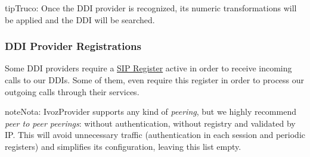 \documentclass[letterpaper,10pt,spanish]{sphinxmanual}
\begin{document}
\begin{notice}{tip}{Truco:}
Once the DDI provider is recognized, its numeric transformations will be applied and the DDI will be searched.
\end{notice}


\subsubsection{DDI Provider Registrations}
\label{administration_portal/brand/providers/ddi_providers:ddi-provider-registrations}
Some DDI providers require a \href{https://tools.ietf.org/html/rfc3261\#section-10}{SIP Register} active in order to receive
incoming calls to our DDIs. Some of them, even require this register in order
to process our outgoing calls through their services.

\begin{notice}{note}{Nota:}
IvozProvider supports any kind of \emph{peering}, but we highly recommend
\emph{peer to peer peerings}: without authentication, without registry and
validated by IP. This will avoid unnecessary traffic (authentication in each
session and periodic registers) and simplifies its configuration, leaving this list empty.
\end{notice}
\end{document}
